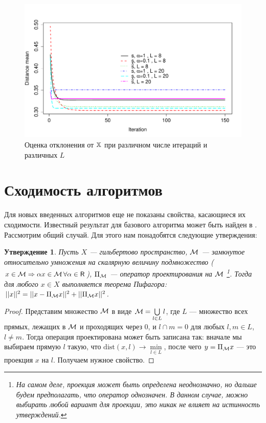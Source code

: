 \documentclass[12pt,a4paper,fleqn,leqno]{article}
\newtheorem{proposition}{Утверждение}%
\begin{document}
\begin{figure}[!h] \begin{center}
\includegraphics[width = 15cm]{cadzowspeed_2.pdf}\caption{Оценка отклонения от $\mathbb{X}$ при различном числе итераций и различных $L$}\label{img_cadzowspeed2}
\end{center}\end{figure}

\section{Сходимость алгоритмов}
Для новых введенных алгоритмов еще не показаны свойства, касающиеся их сходимости. Известный результат для базового алгоритма может быть найден в \cite{Cadzow1988}. Рассмотрим общий случай. Для этого нам понадобятся следующие утверждения:
\begin{proposition} \label{pythaprop}
Пусть $X$ --- гильбертово пространство, $\mathcal{M}$ --- замкнутое относительно умножения на скалярную величину подмножество ($x \in \mathcal{M} \Rightarrow \alpha x \in \mathcal{M} \, \forall \alpha \in \mathsf{R}$), $\Pi_{\mathcal{M}}$ --- оператор проектирования на $\mathcal{M}$ \footnote{На самом деле, проекция может быть определена неоднозначно, но дальше будем предполагать, что оператор однозначен. В данном случае, можно выбирать любой вариант для проекции, это никак не влияет на истинность утверждений.}. Тогда для любого $x \in X$ выполняется теорема Пифагора: $||x||^2 = ||x - \Pi_{\mathcal{M}} x||^2 + ||\Pi_{\mathcal{M}} x||^2$.
\end{proposition}
\begin{proof}
Представим множество $\mathcal{M}$ в виде $\mathcal{M} = \bigcup\limits_{l \in L}l$, где $L$ --- множество всех прямых, лежащих в $\mathcal{M}$ и проходящих через $0$, и $l \cap m = 0$ для любых $l, m \in L$, $l \neq m$. Тогда операция проектирована может быть записана так: вначале мы выбираем прямую $l$ такую, что $\text{dist}(x, l) \rightarrow \min\limits_{l \in L}$, после чего $y = \Pi_{\mathcal{M}} x$ --- это проекция $x$ на $l$. Получаем нужное свойство.
\end{proof}
\end{document}
